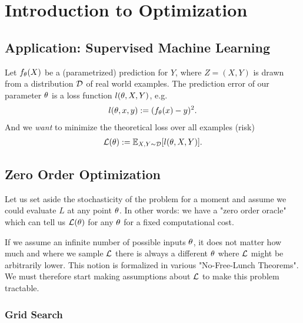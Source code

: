 
\chapter{Introduction to Optimization}

\section{Application: Supervised Machine Learning}

Let \(f_{\theta}(X)\) be a (parametrized) prediction for \(Y\), where \(Z=(X,Y)\)
is drawn from a distribution \(\mathcal{D}\) of real world examples. The prediction
error of our parameter \(\theta\) is a loss function \(l(\theta, X, Y)\), e.g. 
%
\begin{align*}
	l(\theta, x, y) := (f_{\theta}(x) - y)^2.
\end{align*}
%
And we \emph{want} to minimize the theoretical loss over all examples (risk)
%
\begin{align*}
	\mathcal{L}(\theta) := \mathbb{E}_{X,Y\sim \mathcal{D}} [l(\theta, X, Y)].
\end{align*}

\section{Zero Order Optimization}

Let us set aside the stochasticity of the problem for a moment and assume we
could evaluate \(L\) at any point \(\theta\). In other words: we have a "zero
order oracle" which can tell us \(\mathcal{L}(\theta)\) for any \(\theta\) for a fixed
computational cost.

If we assume an infinite number of possible inputs \(\theta\), it does not matter
how much and where we sample \(\mathcal{L}\) there is always a different \(\theta\) where
\(\mathcal{L}\) might be arbitrarily lower. This notion is formalized in various "No-Free-Lunch
Theorems". We must therefore start making assumptions about \(\mathcal{L}\) to make this
problem tractable.

\subsection{Grid Search}


